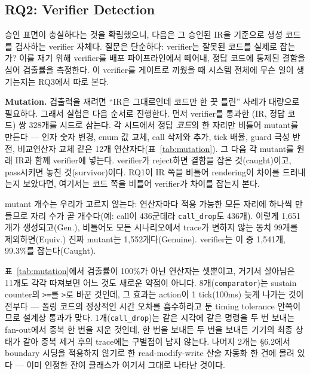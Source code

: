 \documentclass[sigconf,nonacm,anonymous,review]{acmart}
\begin{document}
\subsection{RQ2: Verifier Detection}

승인 표면이 충실하다는 것을 확립했으니, 다음은 그 승인된 IR을 기준으로 생성 코드를 검사하는 verifier 자체다. 질문은 단순하다: verifier는 잘못된 코드를 실제로 잡는가? 이를 재기 위해 verifier를 배포 파이프라인에서 떼어내, 정답 코드에 통제된 결함을 심어 검출률을 측정한다. 이 verifier를 게이트로 끼웠을 때 시스템 전체에 무슨 일이 생기는지는 RQ3에서 따로 본다.

\textbf{Mutation.} 검출력을 재려면 ``IR은 그대로인데 코드만 한 끗 틀린'' 사례가 대량으로 필요하다. 그래서 실험은 다음 순서로 진행한다. 먼저 verifier를 통과한 (IR, 정답 코드) 쌍 328개를 시드로 삼는다. 각 시드에서 정답 \emph{코드}의 한 자리만 비틀어 mutant를 만든다 — 인자 숫자 변경, enum 값 교체, call 삭제와 추가, tick 배율, guard 극성 반전, 비교연산자 교체 같은 12개 연산자다(표~\ref{tab:mutation}). 그 다음 각 mutant를 원래 IR과 함께 verifier에 넣는다. verifier가 reject하면 결함을 잡은 것(caught)이고, pass시키면 놓친 것(survivor)이다. RQ1이 IR 쪽을 비틀어 rendering이 차이를 드러내는지 보았다면, 여기서는 코드 쪽을 비틀어 verifier가 차이를 잡는지 본다.

mutant 개수는 우리가 고르지 않는다: 연산자마다 적용 가능한 모든 자리에 하나씩 만들므로 자리 수가 곧 개수다(예: call이 436군데라 \texttt{call\_drop}도 436개). 이렇게 1,651개가 생성되고(Gen.), 비틀어도 모든 시나리오에서 trace가 변하지 않는 동치 99개를 제외하면(Equiv.) 진짜 mutant는 1,552개다(Genuine). verifier는 이 중 1,541개, 99.3\%를 잡는다(Caught).

표~\ref{tab:mutation}에서 검출률이 100\%가 아닌 연산자는 셋뿐이고, 거기서 살아남은 11개도 각각 따져보면 어느 것도 새로운 약점이 아니다. 8개(\texttt{comparator})는 sustain counter의 \texttt{>=}를 \texttt{>}로 바꾼 것인데, 그 효과는 action이 1 tick(100ms) 늦게 나가는 것이 전부다 — 폴링 코드의 정상적인 시간 오차를 흡수하라고 둔 timing tolerance 안쪽이므로 설계상 통과가 맞다. 1개(\texttt{call\_drop})는 같은 시각에 같은 명령을 두 번 보내는 fan-out에서 중복 한 번을 지운 것인데, 한 번을 보내든 두 번을 보내든 기기의 최종 상태가 같아 중복 제거 후의 trace에는 구별점이 남지 않는다. 나머지 2개는 \S6.2에서 boundary 시딩을 적용하지 않기로 한 read-modify-write 산술 자동화 한 건에 몰려 있다 — 이미 인정한 잔여 클래스가 여기서 그대로 나타난 것이다.
\end{document}
